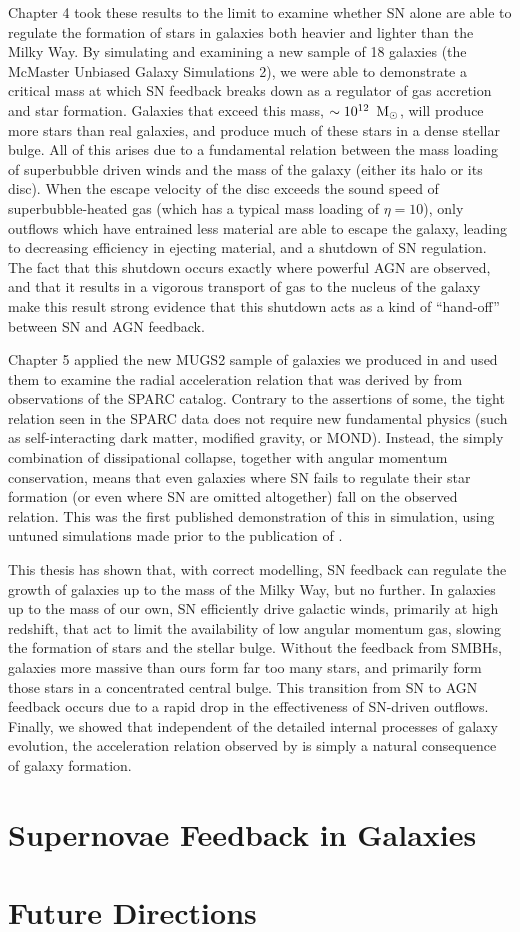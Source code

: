 \documentclass[letterpaper,12pt,twoside,openright]{report} %
\begin{document}
Chapter 4 took these results to the limit to examine whether SN alone are able
to regulate the formation of stars in galaxies both heavier and lighter than the
Milky Way.  By simulating and examining a new sample of 18 galaxies (the
McMaster Unbiased Galaxy Simulations 2), we were able to demonstrate a critical
mass at which SN feedback breaks down as a regulator of gas accretion and star
formation.  Galaxies that exceed this mass, $\sim 10^{12}\;\>{\rm M_{\odot}}$, will produce
more stars than real galaxies, and produce much of these stars in a dense
stellar bulge.  All of this arises due to a fundamental relation between the
mass loading of superbubble driven winds and the mass of the galaxy (either its
halo or its disc).  When the escape velocity of the disc exceeds the sound speed
of superbubble-heated gas (which has a typical mass loading of $\eta=10$), only
outflows which have entrained less material are able to escape the galaxy,
leading to decreasing efficiency in ejecting material, and a shutdown of
SN regulation.  The fact that this shutdown occurs exactly where powerful AGN
are observed, and that it results in a vigorous transport of gas to the nucleus
of the galaxy make this result strong evidence that this shutdown acts as a kind
of ``hand-off'' between SN and AGN feedback.

Chapter 5 applied the new MUGS2 sample of galaxies we produced in
\citet{Keller2016a} and used them to examine the radial acceleration relation
that was derived by \citet{McGaugh2016} from observations of the SPARC
\citep{Lelli2016} catalog.  Contrary to the assertions of some, the tight
relation seen in the SPARC data does not require new fundamental physics (such
as self-interacting dark matter, modified gravity, or MOND).  Instead, the
simply combination of dissipational collapse, together with angular momentum
conservation, means that even galaxies where SN fails to regulate their star
formation (or even where SN are omitted altogether) fall on the observed
relation.  This was the first published demonstration of this in simulation,
using untuned simulations made prior to the publication of \citet{McGaugh2016}.

This thesis has shown that, with correct modelling, SN feedback can regulate the
growth of galaxies up to the mass of the Milky Way, but no further.  In galaxies
up to the mass of our own, SN efficiently drive galactic winds, primarily at
high redshift, that act to limit the availability of low angular momentum gas,
slowing the formation of stars and the stellar bulge. Without the
feedback from SMBHs, galaxies more massive than ours form far too many stars,
and primarily form those stars in a concentrated central bulge.  This transition
from SN to AGN feedback occurs due to a rapid drop in the effectiveness of
SN-driven outflows.  Finally, we showed that independent of the detailed
internal processes of galaxy evolution, the acceleration relation observed by
\citet{McGaugh2016} is simply a natural consequence of galaxy formation.

\section{Supernovae Feedback in Galaxies}
\section{Future Directions}



\end{document}
